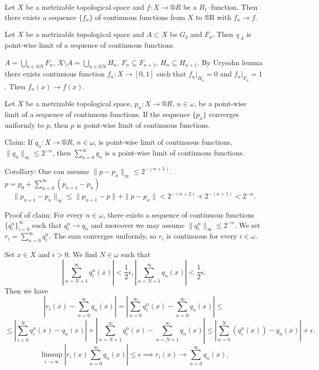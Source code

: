 \documentclass[12pt]{article}					%
\begin{document}
\begin{veta}
	Let $X$ be a metrizable topological space and $f: X \rightarrow ®R$ be a $B_1$–function. Then there exists a sequence $\{f_n\}$ of continuous functions from $X$ to ®R with $f_n \rightarrow f$.
\end{veta}

\begin{lemma}
	Let $X$ be a metrizable topological space and $A \subset X$ be $G_\delta$ and $F_\sigma$. Then $\chi_A$ is point-wise limit of a sequence of continuous functions.

	\begin{dukazin}
		$A = \bigcup_{n \in ®N} F_n$, $X \setminus A = \bigcup_{n \in ®N} H_n$, $F_n \subseteq F_{n+1}$, $H_n \subseteq H_{n+1}$. By Urysohn lemma there exists continuous function $f_n: X \rightarrow [0, 1]$ such that $f_n|_{H_n} = 0$ and $f_n|_{F_n} = 1$. Then $f_n(x) \rightarrow f(x)$.
	\end{dukazin}
\end{lemma}


\begin{lemma}
	Let $X$ be a metrizable topological space, $p_n: X \rightarrow ®R$, $n \in \omega$, be a point-wise limit of a sequence of continuous functions. If the sequence $\{p_n\}$ converges uniformly to $p$, then $p$ is point-wise limit of continuous functions.

	\begin{dukazin}
		Claim: If $q_n: X \rightarrow ®R$, $n \in \omega$, is point-wise limit of continuous functions, $\|q_n\|_∞ ≤ 2^{-n}$, then $\sum_{n=0}^∞ q_n$ is a point-wise limit of continuous functions.

		Corollary: One can assume $\|p - p_n\|_∞ ≤ 2^{-(n+1)}$. $p = p_0 + \sum_{n=0}^∞ (p_{n+1} - p_n)$
		$$ \|p_{n+1} - p_n\|_∞ ≤ \|p_{n+1} - p\| + \|p - p_n\| < 2^{-(n+2)} + 2^{-(n+1)} < 2^{-n}. $$

		Proof of claim: For every $n \in \omega$, there exists a sequence of continuous functions $\{q_i^n\}_{i=0}^∞$ such that $q_i^n \rightarrow q_n$ and moreover we may assume $\|q_i^n\|_∞ ≤ 2^{-n}$. We set $r_i = \sum_{n=0}^∞ q_i^n$. The sum converges uniformly, so $r_i$ is continuous for every $i \in \omega$.

		Set $x \in X$ and $\epsilon > 0$. We find $N \in \omega$ such that
		$$ \left|\sum_{n=N+1}^∞ q_i^n(x)\right| < \frac{1}{2}\epsilon, \left|\sum_{n=N+1}^∞ q_n(x)\right| < \frac{1}{2}\epsilon. $$
		Then we have
		$$ \left|r_i(x) - \sum_{n=0}^∞ q_n(x)\right| = \left|\sum_{n=0}^∞ q_i^n(x) - \sum_{n=0}^∞ q_n(x)\right| ≤ $$
		$$ ≤ \left|\sum_{i=0}^N q_i^n(x) - q_n(x)\right| + \left|\sum_{n=N+1}^∞ q_i^n(x) - \sum_{n=N+1}^∞ q_n(x)\right| ≤ \left|\sum_{n=0}^N (q_i^n(x)) - q_n(x) \right| + \epsilon. $$
		$$ \limsup_{i \rightarrow ∞} |r_i(x) \sum_{n=0}^∞ q_n(x)| ≤ \epsilon \implies r_i(x) \rightarrow \sum_{n=0}^∞ q_n(x). $$
	\end{dukazin}
\end{lemma}
\end{document}
